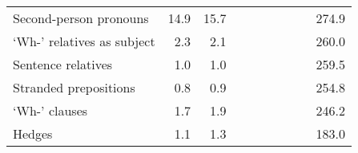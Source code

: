 \begin{table}[!t]
\begin{tabular*}{\linewidth}{@{\extracolsep{\fill}}lrrrrrrrrr}
Second-person pronouns & 14.9 & 15.7 & {\cellcolor[HTML]{F4A582}{\textcolor[HTML]{000000}{63\%}}} & {\cellcolor[HTML]{F4A582}{\textcolor[HTML]{000000}{52\%}}} & {\cellcolor[HTML]{FDDBC7}{\textcolor[HTML]{000000}{77\%}}} & {\cellcolor[HTML]{FDDBC7}{\textcolor[HTML]{000000}{81\%}}} & {\cellcolor[HTML]{D1E5F0}{\textcolor[HTML]{000000}{118\%}}} & {\cellcolor[HTML]{F7F7F7}{\textcolor[HTML]{000000}{110\%}}} & 274.9 \\ 
‘Wh-’ relatives as subject & 2.3 & 2.1 & {\cellcolor[HTML]{F4A582}{\textcolor[HTML]{000000}{70\%}}} & {\cellcolor[HTML]{F4A582}{\textcolor[HTML]{000000}{66\%}}} & {\cellcolor[HTML]{F7F7F7}{\textcolor[HTML]{000000}{109\%}}} & {\cellcolor[HTML]{F7F7F7}{\textcolor[HTML]{000000}{102\%}}} & {\cellcolor[HTML]{F7F7F7}{\textcolor[HTML]{000000}{106\%}}} & {\cellcolor[HTML]{F7F7F7}{\textcolor[HTML]{000000}{103\%}}} & 260.0 \\ 
Sentence relatives & 1.0 & 1.0 & {\cellcolor[HTML]{F4A582}{\textcolor[HTML]{000000}{50\%}}} & {\cellcolor[HTML]{F4A582}{\textcolor[HTML]{000000}{51\%}}} & {\cellcolor[HTML]{F7F7F7}{\textcolor[HTML]{000000}{104\%}}} & {\cellcolor[HTML]{D1E5F0}{\textcolor[HTML]{000000}{117\%}}} & {\cellcolor[HTML]{F7F7F7}{\textcolor[HTML]{000000}{101\%}}} & {\cellcolor[HTML]{F7F7F7}{\textcolor[HTML]{000000}{92\%}}} & 259.5 \\ 
Stranded prepositions & 0.8 & 0.9 & {\cellcolor[HTML]{F4A582}{\textcolor[HTML]{000000}{66\%}}} & {\cellcolor[HTML]{F4A582}{\textcolor[HTML]{000000}{66\%}}} & {\cellcolor[HTML]{D1E5F0}{\textcolor[HTML]{000000}{111\%}}} & {\cellcolor[HTML]{D1E5F0}{\textcolor[HTML]{000000}{114\%}}} & {\cellcolor[HTML]{FDDBC7}{\textcolor[HTML]{000000}{87\%}}} & {\cellcolor[HTML]{FDDBC7}{\textcolor[HTML]{000000}{81\%}}} & 254.8 \\ 
‘Wh-’ clauses & 1.7 & 1.9 & {\cellcolor[HTML]{FDDBC7}{\textcolor[HTML]{000000}{75\%}}} & {\cellcolor[HTML]{F4A582}{\textcolor[HTML]{000000}{66\%}}} & {\cellcolor[HTML]{FDDBC7}{\textcolor[HTML]{000000}{90\%}}} & {\cellcolor[HTML]{FDDBC7}{\textcolor[HTML]{000000}{78\%}}} & {\cellcolor[HTML]{D1E5F0}{\textcolor[HTML]{000000}{126\%}}} & {\cellcolor[HTML]{D1E5F0}{\textcolor[HTML]{000000}{122\%}}} & 246.2 \\ 
Hedges & 1.1 & 1.3 & {\cellcolor[HTML]{D6604D}{\textcolor[HTML]{FFFFFF}{50\%}}} & {\cellcolor[HTML]{F4A582}{\textcolor[HTML]{000000}{63\%}}} & {\cellcolor[HTML]{F4A582}{\textcolor[HTML]{000000}{62\%}}} & {\cellcolor[HTML]{F4A582}{\textcolor[HTML]{000000}{67\%}}} & {\cellcolor[HTML]{FDDBC7}{\textcolor[HTML]{000000}{89\%}}} & {\cellcolor[HTML]{F7F7F7}{\textcolor[HTML]{000000}{92\%}}} & 183.0 \\ 

\end{tabular*}
\end{table}
